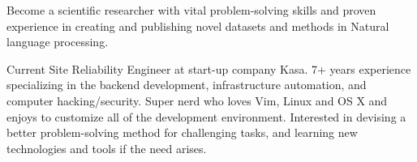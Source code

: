 

\begin{cvparagraph}

Become a scientific researcher with vital problem-solving skills and proven experience in creating and publishing novel datasets and methods in Natural language processing.

Current Site Reliability Engineer at start-up company Kasa. 7+ years experience specializing in the backend development, infrastructure automation, and computer hacking/security. Super nerd who loves Vim, Linux and OS X and enjoys to customize all of the development environment. Interested in devising a better problem-solving method for challenging tasks, and learning new technologies and tools if the need arises.
\end{cvparagraph}
